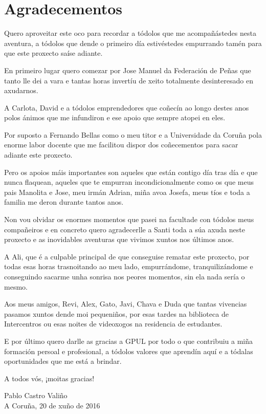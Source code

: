 \thispagestyle{empty}
\section*{Agradecementos}

Quero aproveitar este oco para recordar a tódolos que me acompañástedes nesta 
aventura, a tódolos que dende o primeiro día estivéstedes empurrando tamén 
para que este proxecto saíse adiante.

En primeiro lugar quero comezar por Jose Manuel da Federación de Peñas que 
tanto lle dei a vara e tantas horas invertíu de xeito totalmente desinteresado 
en axudarnos.

A Carlota, David e a tódolos emprendedores que coñecín ao longo destes anos 
polos ánimos que me infundiron e ese apoio que sempre atopei en eles.

Por suposto a Fernando Bellas como o meu titor e a Universidade da Coruña 
pola enorme labor docente que me facilitou dispor dos coñecementos para sacar 
adiante este proxecto.

Pero os apoios máis importantes son aqueles que están contigo día tras día 
e que nunca flaquean, aqueles que te empurran incondicionalmente como os 
que meus pais Manolita e Jose, meu irmán Adrian, miña avoa Josefa, meus tíos e 
toda a familia me deron durante tantos anos.

Non vou olvidar os enormes momentos que pasei na facultade con tódolos meus 
compañeiros e en concreto quero agradecerlle a Santi toda a súa axuda neste 
proxecto e as inovidables aventuras que vivimos xuntos nos últimos anos.

A Ali, que é a culpable principal de que conseguise rematar este proxecto, por 
todas esas horas trasnoitando ao meu lado, empurrándome, tranquilizándome e 
conseguindo sacarme unha sonrisa nos peores momentos, sin ela nada sería o 
mesmo.

Aos meus amigos, Revi, Alex, Gato, Javi, Chava e Duda que tantas vivencias 
pasamos xuntos dende moi pequeniños, por esas tardes na biblioteca de 
Intercentros ou esas noites de videoxogos na residencia de estudantes.

E por último quero darlle as gracias a GPUL por todo o que contribuiu a miña 
formación persoal e profesional, a tódolos valores que aprendín aquí e a 
tódalas oportunidades que me está a brindar.

A todos vós, ¡moitas gracias! \\[2cm]

\begin{flushright}
  Pablo Castro Valiño \\
  A Coruña, 20 de xuño de 2016
\end{flushright}

